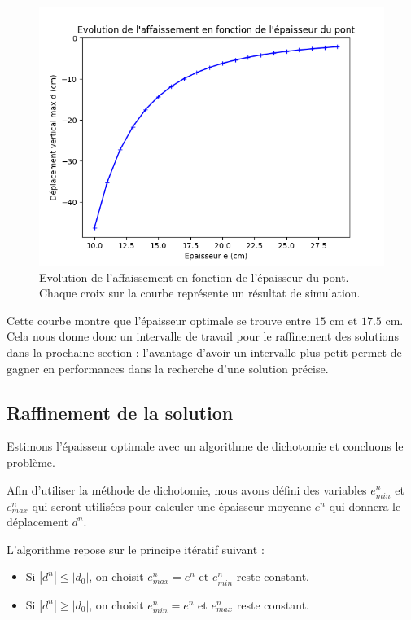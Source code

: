 \documentclass{article}
\begin{document}
    \begin{figure}
    \begin{center}
	
        \includegraphics[width=12cm]{imgs/ed.png}
        \caption{Evolution de l'affaissement en fonction de l'épaisseur du pont. Chaque croix sur la courbe représente un résultat de simulation.}
        \label{fig:graph}
    
	\end{center}
    \end{figure}
    
    Cette courbe montre que l'épaisseur optimale se trouve entre $15$ cm et $17.5$ cm. 
    Cela nous donne donc un intervalle de travail pour le raffinement des solutions dans la prochaine section :
    l'avantage d'avoir un intervalle plus petit permet de gagner en performances dans la recherche d'une solution précise.

    \subsection{Raffinement de la solution}

    \begin{problem}{6}
        Estimons l'épaisseur optimale avec un algorithme de dichotomie et concluons le problème.
    \end{problem}
    
    Afin d'utiliser la méthode de dichotomie, 
    nous avons défini des variables $e^n_{min}$ et $e^n_{max}$  qui seront utilisées pour calculer une épaisseur moyenne $e^n$ 	
    qui donnera le déplacement $d^n$. 
    
    L'algorithme repose sur le principe itératif suivant :    
    \begin{itemize}
    \item Si $|d^n| \le |d_0|$, on choisit $e^n_{max} = e^n$ et $e^n_{min}$ reste constant.
    \item Si $|d^n| \ge |d_0|$, on choisit $e^n_{min} = e^n$ et $e^n_{max}$ reste constant.
    \end{itemize}
   
\end{document}
